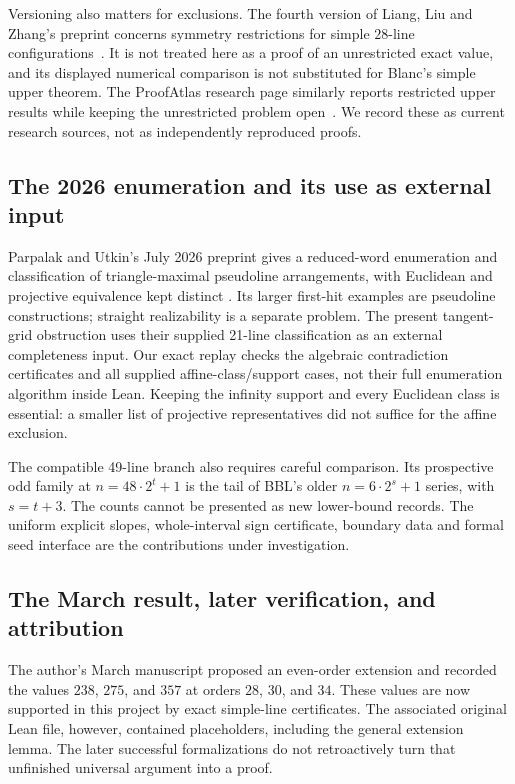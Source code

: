 Versioning also matters for exclusions. The fourth version of Liang, Liu and Zhang's preprint concerns symmetry restrictions for simple $28$-line configurations~\citep{liangliuZhang2026}. It is not treated here as a proof of an unrestricted exact value, and its displayed numerical comparison is not substituted for Blanc's simple upper theorem. The ProofAtlas research page similarly reports restricted upper results while keeping the unrestricted problem open~\citep{proofatlas2026}. We record these as current research sources, not as independently reproduced proofs.

\subsection{The 2026 enumeration and its use as external input}

Parpalak and Utkin's July 2026 preprint gives a reduced-word enumeration
and classification of triangle-maximal pseudoline arrangements, with
Euclidean and projective equivalence kept distinct
\cite{parpalakutkinEnumeration2026}. Its larger first-hit examples are
pseudoline constructions; straight realizability is a separate problem.
The present tangent-grid obstruction uses their supplied 21-line
classification as an external completeness input. Our exact replay
checks the algebraic contradiction certificates and all supplied
affine-class/support cases, not their full enumeration algorithm inside
Lean. Keeping the infinity support and every Euclidean class is
essential: a smaller list of projective representatives did not suffice
for the affine exclusion.

The compatible 49-line branch also requires careful comparison. Its
prospective odd family at $n=48\cdot2^t+1$ is the tail of BBL's older
$n=6\cdot2^s+1$ series, with $s=t+3$. The counts cannot be presented as
new lower-bound records. The uniform explicit slopes, whole-interval
sign certificate, boundary data and formal seed interface are the
contributions under investigation.

\subsection{The March result, later verification, and attribution}

The author's March manuscript proposed an even-order extension and recorded the values $238$, $275$, and $357$ at orders $28$, $30$, and $34$\citep{zarzuelo2026}. These values are now supported in this project by exact simple-line certificates. The associated original Lean file, however, contained placeholders, including the general extension lemma. The later successful formalizations do not retroactively turn that unfinished universal argument into a proof.

